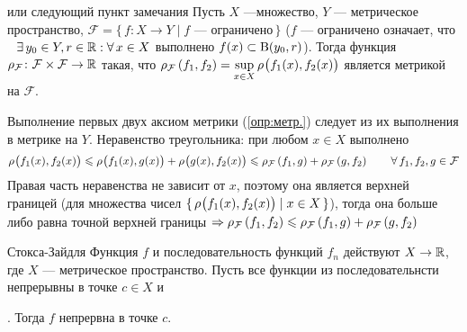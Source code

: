 \begin{lem}[https://www.youtube.com/live/oGN0SkfpZME?si=v9AomZJHSzhlMvMm&t=10556]{или следующий пункт замечания}
	Пусть $X$ ---множество, $Y$ --- метрическое пространство,\quad 
	$\mathcal F = \{\, f \colon X \to Y \mid f\text{ --- ограничено}\,\}$ \linebreak 
	({\small$f$ --- ограничено означает, что$\E y_0 \in Y, r \in \rr : \A x \in X$ выполнено $f(x) \subset \B{y_0, r}$}). 
	Тогда функция $\rho_{\mathcal F} \colon \mathcal{F} \times \mathcal{F} \to \rr$ такая, что 
	$\metr[\mathcal F]{f_1, f_2} = \sup\limits_{x \in X} \bmetr{f_1(x), f_2(x)}$ 
	является метрикой на $\mathcal F$.
\end{lem} %
	
\begin{prf} %
	Выполнение \smallskip первых двух аксиом метрики (\ref{опр:метр.}) следует из их выполнения в метрике на $Y$. Неравенство треугольника: при любом $x \in X$ выполнено
	\[\bmetr{f_1(x), f_2(x)} \< \bmetr{f_1(x), g(x)} + \bmetr{g(x), f_2(x)} \< \metr[\mathcal F]{f_1, g} + \metr[\mathcal F]{g, f_2} \qquad \A f_1, f_2, g \in \mathcal F\]
	Правая часть неравенства не зависит от $x$, поэтому она является верхней границей (для множества чисел $\{\,\bmetr{f_1(x), f_2(x)} \mid x \in X\,\}$), тогда она больше \smallskip либо равна точной верхней границы  $\Rightarrow \metr[\mathcal F]{f_1, f_2} \< \metr[\mathcal F]{f_1, g} + \metr[\mathcal F]{g, f_2}$
\end{prf} %

\begin{teor}[https://www.youtube.com/live/oGN0SkfpZME?si=rzyEi2Hd6nOeRw-i&t=11638]{Стокса-Зайдля}
	Функция $f$ и последовательность функций $f_n$ действуют $X \to \rr$, где $X$ --- метрическое пространство. Пусть все функции из последовательнсти непрерывны в точке $c \in X$ и\!. Тогда $f$ непрервна в точке $c$.
\end{teor} %

\begin{prf}
	
\end{prf}
	